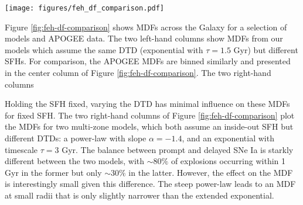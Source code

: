 \documentclass[twocolumn,twocolappendix,linenumbers,trackchanges]{aastex631}
\begin{document}
\begin{figure*}
    \centering
    \texttt{[image: figures/feh\_df\_comparison.pdf]}
    \caption{Distributions of [Fe/H] from multi-zone models with various models for the SFH and DTD. Each row presents distributions of stars within a range of absolute midplane distance: $1\leq|z|<2$ kpc (\textit{top}), $0.5\leq|z|<1$ kpc (\textit{middle}), and $0\leq|z|<0.5$ kpc (\textit{bottom}). Within each panel, curves of different color represent the distributions of stars binned by Galactocentric radius $R_{\rm gal}$, from $3\leq R_{\rm gal}<5$ kpc (yellow) to $13\leq R_{\rm gal}<15$ kpc (blue). Each distribution is normalized so the area under the curve is 1, and the vertical scale is consistent across each row. All distributions are convolved with observational uncertainties in APOGEE DR17 (see Table \ref{tab:sample}) and smoothed with a box-car width of 0.2 dex. 
    \textit{Left columns:} comparison between the inside-out and two-infall SFHs; both assume the exponential ($\tau=1.5$ Gyr) DTD. 
    \textit{Center column:} the distributions from APOGEE DR17 for reference, binned and smoothed similarly.
    \textit{Right columns:} comparison between the power-law ($\alpha=-1.4$) and exponential ($\tau=3$ Gyr) DTDs with the inside-out SFH.}
    \label{fig:feh-df-comparison}
\end{figure*}

Figure \ref{fig:feh-df-comparison} shows MDFs across the Galaxy for a selection of models and APOGEE data. The two left-hand columns show MDFs from our models which assume the same DTD (exponential with $\tau=1.5$ Gyr) but different SFHs. For comparison, the APOGEE MDFs are binned similarly and presented in the center column of Figure \ref{fig:feh-df-comparison}.  The two right-hand columns

Holding the SFH fixed, varying the DTD has minimal influence on these MDFs for fixed SFH. The two right-hand columns of Figure \ref{fig:feh-df-comparison} plot the MDFs for two multi-zone models, which both assume an inside-out SFH but different DTDs: a power-law with slope $\alpha=-1.4$, and an exponential with timescale $\tau=3$ Gyr. The balance between prompt and delayed SNe Ia is starkly different between the two models, with $\sim 80\%$ of explosions occurring within 1 Gyr in the former but only $\sim 30\%$ in the latter. 
However, the effect on the MDF is interestingly small given this difference. The steep power-law leads to an MDF at small radii that is only slightly narrower than the extended exponential.
\end{document}

